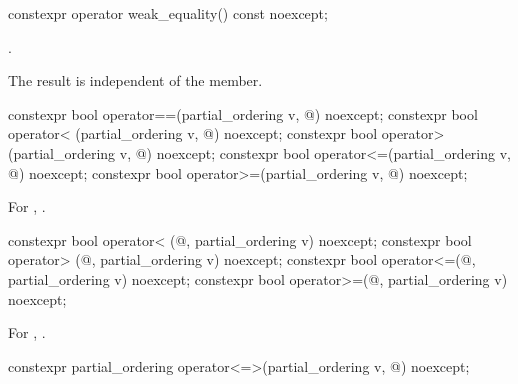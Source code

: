 %
\begin{itemdecl}
constexpr operator weak_equality() const noexcept;
\end{itemdecl}

\begin{itemdescr}
\pnum
\returns
{}.
\begin{note}
The result is independent of the  member.
\end{note}
\end{itemdescr}

%
%
%
%
%
\begin{itemdecl}
constexpr bool operator==(partial_ordering v, @\unspec@) noexcept;
constexpr bool operator< (partial_ordering v, @\unspec@) noexcept;
constexpr bool operator> (partial_ordering v, @\unspec@) noexcept;
constexpr bool operator<=(partial_ordering v, @\unspec@) noexcept;
constexpr bool operator>=(partial_ordering v, @\unspec@) noexcept;
\end{itemdecl}

\begin{itemdescr}
\pnum
\returns
For , .
\end{itemdescr}

%
%
%
%
\begin{itemdecl}
constexpr bool operator< (@\unspec@, partial_ordering v) noexcept;
constexpr bool operator> (@\unspec@, partial_ordering v) noexcept;
constexpr bool operator<=(@\unspec@, partial_ordering v) noexcept;
constexpr bool operator>=(@\unspec@, partial_ordering v) noexcept;
\end{itemdecl}

\begin{itemdescr}
\pnum
\returns
For , .
\end{itemdescr}

%
\begin{itemdecl}
constexpr partial_ordering operator<=>(partial_ordering v, @\unspec@) noexcept;
\end{itemdecl}

